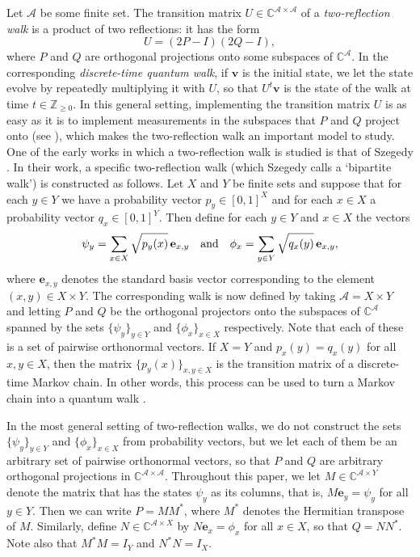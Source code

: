 \documentclass{article}
\numberwithin{equation}{section}
\newcommand\cx{{\mathbb C}}%
\newcommand\ints{{\mathbb Z}}
\newcommand\cA{{\mathcal A}}
\newcommand\Ze{{\mathbf e}}
\newcommand\Zv{{\mathbf v}}
\begin{document}
Let $\cA$ be some finite set. The transition matrix $U \in \cx^{\cA \times \cA}$ of a \textsl{two-reflection walk} is a product of two reflections: it has the form
\[
U = (2P - I)(2Q - I),
\]
where $P$ and $Q$ are orthogonal projections onto some subspaces of $\cx^{\cA}$. In the corresponding \textsl{discrete-time quantum walk}, if $\Zv$ is the initial state, we let the state evolve by repeatedly multiplying it with $U$, so that $U^t\Zv$ is the state of the walk at time $t \in \ints_{\geq 0}$. In this general setting, implementing the transition matrix $U$ is as easy as it is to implement measurements in the subspaces that $P$ and $Q$ project onto (see \cite[Claim 3.16]{JefZur2023}), which makes the two-reflection walk an important model to study. One of the early works in which a two-reflection walk is studied is that of Szegedy \cite{Sze2004}. In their work, a specific two-reflection walk (which Szegedy calls a `bipartite walk') is constructed as follows. Let $X$ and $Y$ be finite sets and suppose that for each $y \in Y$ we have a probability vector $p_y \in [0,1]^X$ and for each $x \in X$ a probability vector $q_x \in [0,1]^Y$. Then define for each $y \in Y$ and $x \in X$ the vectors
\[
\psi_y = \sum_{x\in X} \sqrt{p_y(x)}\, \Ze_{x,y} \quad \text{and} \quad \phi_x = \sum_{y\in Y} \sqrt{\vphantom{p_y}q_x(y)}\, \Ze_{x,y},
\]
where $\Ze_{x,y}$ denotes the standard basis vector corresponding to the element $(x,y) \in X \times Y$. The corresponding walk is now defined by taking $\cA = X \times Y$ and letting $P$ and $Q$ be the orthogonal projectors onto the subspaces of $\cx^{\cA}$ spanned by the sets $\{\psi_y\}_{y\in Y}$ and $\{\phi_x\}_{x\in X}$ respectively. Note that each of these is a set of pairwise orthonormal vectors. If $X = Y$ and $p_x(y) = q_x(y)$ for all $x,y \in X$, then the matrix $\{p_y(x)\}_{x,y \in X}$ is the transition matrix of a discrete-time Markov chain. In other words, this process can be used to turn a Markov chain into a quantum walk \cite{Sze2004}.

In the most general setting of two-reflection walks, we do not construct the sets $\{\psi_y\}_{y\in Y}$ and $\{\phi_x\}_{x\in X}$ from probability vectors, but we let each of them be an arbitrary set of pairwise orthonormal vectors, so that $P$ and $Q$ are arbitrary orthogonal projections in $\cx^{\cA \times \cA}$. Throughout this paper, we let $M \in \cx^{\cA \times Y}$ denote the matrix that has the states $\psi_y$ as its columns, that is, $M\Ze_y = \psi_y$ for all $y \in Y$. Then we can write $P = MM^*$, where $M^*$ denotes the Hermitian transpose of $M$. Similarly, define $N \in \cx^{\cA \times X}$ by $N\Ze_x = \phi_x$ for all $x \in X$, so that $Q = NN^*$. Note also that $M^*M = I_Y$ and $N^*N = I_X$.
\end{document}
